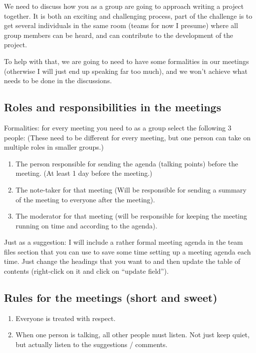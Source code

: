 \documentclass[
]{book}
\begin{document}
We need to discuss how you as a group are going to approach writing a project together. It is both an exciting and challenging process, part of the challenge is to get several individuals in the same room (teams for now I presume) where all group members can be heard, and can contribute to the development of the project.

To help with that, we are going to need to have some formalities in our meetings (otherwise I will just end up speaking far too much), and we won't achieve what needs to be done in the discussions.

\hypertarget{roles-and-responsibilities-in-the-meetings}{%
\subsection{Roles and responsibilities in the meetings}\label{roles-and-responsibilities-in-the-meetings}}

Formalities: for every meeting you need to as a group select the following 3 people:
(These need to be different for every meeting, but one person can take on multiple roles in smaller groups.)

\begin{enumerate}
\def\labelenumi{\arabic{enumi}.}
\item
  The person responsible for sending the agenda (talking points) before the meeting. (At least 1 day before the meeting.)
\item
  The note-taker for that meeting (Will be responsible for sending a summary of the meeting to everyone after the meeting).
\item
  The moderator for that meeting (will be responsible for keeping the meeting running on time and according to the agenda).
\end{enumerate}

Just as a suggestion: I will include a rather formal meeting agenda in the team files section that you can use to save some time setting up a meeting agenda each time. Just change the headings that you want to and then update the table of contents (right-click on it and click on ``update field'').

\hypertarget{rules-for-the-meetings-short-and-sweet}{%
\subsection{Rules for the meetings (short and sweet)}\label{rules-for-the-meetings-short-and-sweet}}

\begin{enumerate}
\def\labelenumi{\arabic{enumi}.}
\item
  Everyone is treated with respect.
\item
  When one person is talking, all other people must listen. Not just keep quiet, but actually listen to the suggestions / comments.
\end{enumerate}
\end{document}
